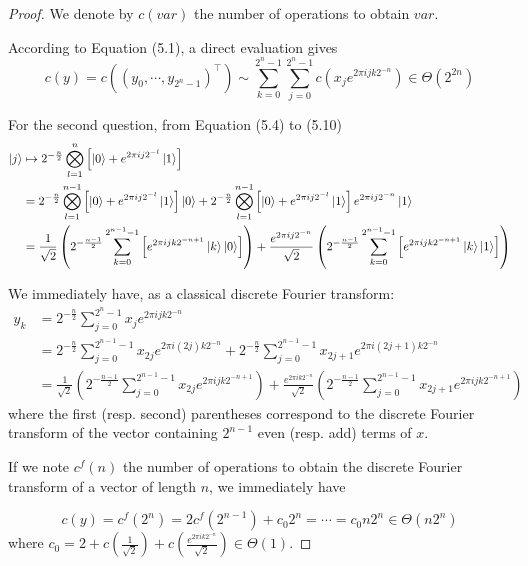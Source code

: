 \documentclass[../main.tex]{subfiles}
\begin{document}
\bigskip
\begin{exercise}
\end{exercise}
\begin{proof}
We denote by $c(var)$ the number of operations to obtain $var$.

According to Equation (5.1), a direct evaluation gives
\[
    c(y)=c(\left(y_0,\cdots,y_{2^n-1}\right)^\intercal)\sim\sum_{k=0}^{2^n-1}\sum_{j=0}^{2^n-1}c(x_j e^{2\pi i j k 2^{-n}})\in\Theta(2^{2n})
\]

For the second question, from Equation (5.4) to (5.10)
\begin{align*}
    \ket{j}
    &\mapsto 2^{-\frac{n}{2}}\bigotimes_{l=1}^n \left[\ket{0}+e^{2\pi i j 2^{-l}}\ket{1}\right] \\
    &= 2^{-\frac{n}{2}}\bigotimes_{l=1}^{n-1} \left[\ket{0}+e^{2\pi i j 2^{-l}}\ket{1}\right] \ket{0} + 2^{-\frac{n}{2}}\bigotimes_{l=1}^{n-1} \left[\ket{0}+e^{2\pi i j 2^{-l}}\ket{1}\right] e^{2\pi i j 2^{-n}}\ket{1} \\
    &= \frac{1}{\sqrt{2}}\left(2^{-\frac{n-1}{2}}\sum_{k=0}^{2^{n-1}-1}\left[e^{2\pi i j k 2^{-n+1}}\ket{k}\ket{0}\right]\right) + \frac{e^{2\pi i j 2^{-n}}}{\sqrt{2}}\left(2^{-\frac{n-1}{2}}\sum_{k=0}^{2^{n-1}-1}\left[e^{2\pi i j k 2^{-n+1}}\ket{k}\ket{1}\right]\right)
\end{align*}

We immediately have, as a classical discrete Fourier transform:
\begin{align*}
    y_k
    &= 2^{-\frac{n}{2}}\sum_{j=0}^{2^n-1}x_j e^{2\pi i j k 2^{-n}}\\
    &= 2^{-\frac{n}{2}}\sum_{j=0}^{2^{n-1}-1}x_{2j}e^{2\pi i(2j)k 2^{-n}}+2^{-\frac{n}{2}}\sum_{j=0}^{2^{n-1}-1}x_{2j+1}e^{2\pi i(2j+1)k 2^{-n}}\\
    &= \frac{1}{\sqrt{2}}\left(2^{-\frac{n-1}{2}}\sum_{j=0}^{2^{n-1}-1}x_{2j}e^{2\pi i j k 2^{-n+1}}\right)+\frac{e^{2\pi i k 2^{-n}}}{\sqrt{2}}\left(2^{-\frac{n-1}{2}}\sum_{j=0}^{2^{n-1}-1}x_{2j+1}e^{2\pi i j k 2^{-n+1}}\right)
\end{align*}
where the first (resp. second) parentheses correspond to the discrete Fourier transform of the vector containing $2^{n-1}$ even (resp. add) terms of $x$. 

If we note $c^f(n)$ the number of operations to obtain the discrete Fourier transform of a vector of length $n$, we immediately have 

\[
    c(y)=c^f(2^n)=2c^f(2^{n-1})+c_0 2^n = \cdots = c_0 n 2^n \in \Theta(n 2^n)
\]
where $c_0=2+c(\frac{1}{\sqrt{2}})+c(\frac{e^{2\pi i k 2^{-n}}}{\sqrt{2}})\in\Theta(1)$.
\end{proof}
\end{document}
